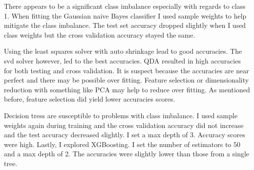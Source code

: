 \documentclass[11pt,letterpaper]{article}
\begin{document}
There appears to be a significant class imbalance especially with regards to
class 1. When fitting the Gaussian naive Bayes classifier I used sample weights
to help mitigate the class imbalance.  The test set accuracy dropped slightly
when I used class weights but the cross validation accuracy stayed the same.

Using the least squares solver with auto shrinkage lead to good accuracies.  The
svd solver however, led to the best accuracies.  QDA resulted in high accuracies
for both testing and cross validation.  It is suspect because the accuracies are
near perfect and there may be possible over fitting.  Feature selection or
dimensionality reduction with something like PCA may help to reduce over fitting.
As mentioned before, feature selection did yield lower accuracies scores.

Decision tress are susceptible to problems with class imbalance.  I used sample
weights again during training and the cross validation accuracy did not increase
and the test accuracy decreased slightly.  I set a max depth of 3.  Accuracy
scores were high.  Lastly, I explored XGBoosting.  I set the number of
estimators to 50 and a max depth of 2.  The accuracies were slightly lower than
those from a single tree.   
\noindent
\end{document}
